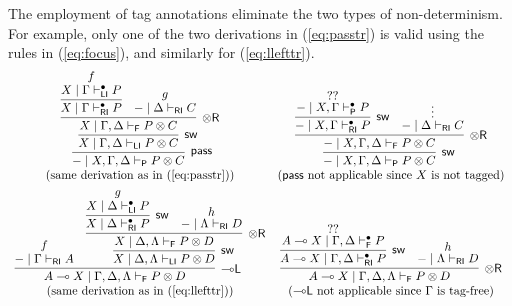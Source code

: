 \documentclass[submission,copyright,creativecommons]{eptcs}
\theoremstyle{definition}
\newcommand{\tr}{\otimes \mathsf{R}}
\newcommand{\lleft}{{\multimap}\mathsf{L}}
\newcommand{\pass}{\mathsf{pass}}
\newcommand{\ot}{\otimes}
\newcommand{\lolli}{\multimap}
\newcommand{\RI}{\mathsf{RI}}
\newcommand{\LI}{\mathsf{LI}}
\newcommand{\Pass}{\mathsf{P}}
\newcommand{\F}{\mathsf{F}}
\begin{document}
The employment of tag annotations eliminate the two types of non-determinism. For example, only one of the two derivations in (\ref{eq:passtr}) is valid using the rules in (\ref{eq:focus}), and similarly for (\ref{eq:llefttr}).
\begin{displaymath}
  \begin{array}{cc}
      \infer[\pass]{- \mid X , \Gamma , \Delta \vdash_{\Pass} P \ot C}{
        \infer[\mathsf{sw}]{X \mid \Gamma , \Delta \vdash_{\LI} P \ot C}{
          \infer[\tr]{X \mid \Gamma , \Delta \vdash_{\F} P \ot C}{
            \infer{X \mid \Gamma \vdash^{\bullet}_{\RI} P}{
              \deduce{X \mid \Gamma \vdash^{\bullet}_{\LI} P}{f}
              }
            &
            \deduce{- \mid \Delta \vdash_{\RI} C}{g}
          }
        }
      }
    &
    \infer[\mathsf{sw}]{- \mid X , \Gamma , \Delta \vdash_{\Pass} P \ot C}{
      \infer[\tr]{- \mid X , \Gamma , \Delta \vdash_{\F} P \ot C}{
        \infer[\mathsf{sw}]{- \mid X , \Gamma \vdash^{\bullet}_{\RI} P}{
          \deduce{- \mid X , \Gamma \vdash^{\bullet}_{\Pass} P}{??}
        }
        &
        \deduce{- \mid \Delta \vdash_{\RI} C}{\vdots}
      }
    }
    \\
    (\text{same derivation as in (\ref{eq:passtr})})
    &
    (\text{$\pass$ not applicable since $X$ is not tagged})
    \\[6pt]
      \infer[\lleft]{A \lolli X \mid \Gamma , \Delta , \Lambda \vdash_{\F} P \ot D}{
        \deduce{- \mid \Gamma \vdash_{\RI} A}{f}
        &
        \infer[\mathsf{sw}]{X \mid \Delta , \Lambda \vdash_{\LI} P \ot D}{
          \infer[\tr]{X \mid \Delta , \Lambda \vdash_{\F} P \ot D}{
            \infer[\mathsf{sw}]{X \mid \Delta \vdash^{\bullet}_{\RI} P}{
              \deduce{X \mid \Delta \vdash^{\bullet}_{\LI} P}{g}
              }
            &
            \deduce{- \mid \Lambda \vdash_{\RI} D}{h}
          }
        }
      }
    &
      \infer[\tr]{A \lolli X \mid \Gamma , \Delta , \Lambda \vdash_{\F} P \ot D}{
        \infer[\mathsf{sw}]{A \lolli X \mid \Gamma , \Delta \vdash^{\bullet}_{\RI} P}{
          \deduce{A \lolli X \mid \Gamma , \Delta \vdash^{\bullet}_{\F} P}{??}
        }
        &
        \deduce{- \mid \Lambda \vdash_{\RI} D}{h}
      }
    \\
    (\text{same derivation as in (\ref{eq:llefttr})})
    &
    (\text{$\lleft$ not applicable since $\Gamma$ is tag-free})
   \end{array}
  \end{displaymath}
\end{document}
